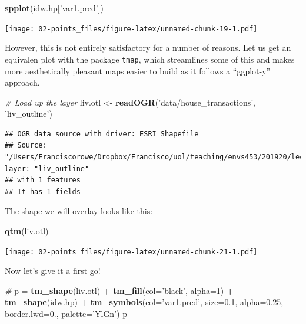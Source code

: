 \documentclass[]{book}
\newenvironment{Shaded}{\begin{snugshade}}{\end{snugshade}}
\newcommand{\KeywordTok}[1]{\textcolor[rgb]{0.13,0.29,0.53}{\textbf{#1}}}
\newcommand{\DataTypeTok}[1]{\textcolor[rgb]{0.13,0.29,0.53}{#1}}
\newcommand{\DecValTok}[1]{\textcolor[rgb]{0.00,0.00,0.81}{#1}}
\newcommand{\FloatTok}[1]{\textcolor[rgb]{0.00,0.00,0.81}{#1}}
\newcommand{\StringTok}[1]{\textcolor[rgb]{0.31,0.60,0.02}{#1}}
\newcommand{\CommentTok}[1]{\textcolor[rgb]{0.56,0.35,0.01}{\textit{#1}}}
\newcommand{\OperatorTok}[1]{\textcolor[rgb]{0.81,0.36,0.00}{\textbf{#1}}}
\newcommand{\NormalTok}[1]{#1}
\begin{document}
\begin{Shaded}
\begin{Highlighting}[]
\KeywordTok{spplot}\NormalTok{(idw.hp[}\StringTok{'var1.pred'}\NormalTok{])}
\end{Highlighting}
\end{Shaded}

\texttt{[image: 02-points\_files/figure-latex/unnamed-chunk-19-1.pdf]}

However, this is not entirely satisfactory for a number of reasons. Let
us get an equivalen plot with the package \texttt{tmap}, which
streamlines some of this and makes more aesthetically pleasant maps
easier to build as it follows a ``ggplot-y'' approach.

\begin{Shaded}
\begin{Highlighting}[]
\CommentTok{# Load up the layer}
\NormalTok{liv.otl <-}\StringTok{ }\KeywordTok{readOGR}\NormalTok{(}\StringTok{'data/house_transactions'}\NormalTok{, }\StringTok{'liv_outline'}\NormalTok{)}
\end{Highlighting}
\end{Shaded}

\begin{verbatim}
## OGR data source with driver: ESRI Shapefile 
## Source: "/Users/Franciscorowe/Dropbox/Francisco/uol/teaching/envs453/201920/lectures/san/data/house_transactions", layer: "liv_outline"
## with 1 features
## It has 1 fields
\end{verbatim}

The shape we will overlay looks like this:

\begin{Shaded}
\begin{Highlighting}[]
\KeywordTok{qtm}\NormalTok{(liv.otl)}
\end{Highlighting}
\end{Shaded}

\texttt{[image: 02-points\_files/figure-latex/unnamed-chunk-21-1.pdf]}

Now let's give it a first go!

\begin{Shaded}
\begin{Highlighting}[]
\CommentTok{# }
\NormalTok{p =}\StringTok{ }\KeywordTok{tm_shape}\NormalTok{(liv.otl) }\OperatorTok{+}\StringTok{ }\KeywordTok{tm_fill}\NormalTok{(}\DataTypeTok{col=}\StringTok{'black'}\NormalTok{, }\DataTypeTok{alpha=}\DecValTok{1}\NormalTok{) }\OperatorTok{+}
\StringTok{  }\KeywordTok{tm_shape}\NormalTok{(idw.hp) }\OperatorTok{+}\StringTok{ }
\StringTok{  }\KeywordTok{tm_symbols}\NormalTok{(}\DataTypeTok{col=}\StringTok{'var1.pred'}\NormalTok{, }\DataTypeTok{size=}\FloatTok{0.1}\NormalTok{, }\DataTypeTok{alpha=}\FloatTok{0.25}\NormalTok{, }
             \DataTypeTok{border.lwd=}\DecValTok{0}\NormalTok{., }\DataTypeTok{palette=}\StringTok{'YlGn'}\NormalTok{)}
\NormalTok{p}
\end{Highlighting}
\end{Shaded}
\end{document}
